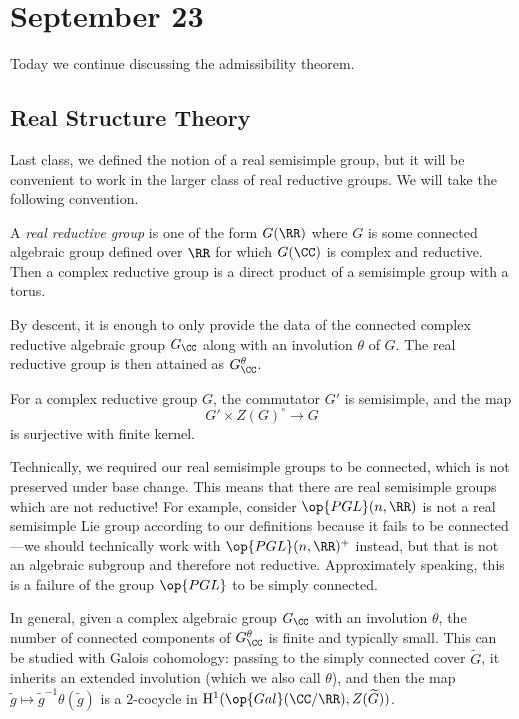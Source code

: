 \documentclass[../notes.tex]{subfiles}
\begin{document}
\section{September 23}
Today we continue discussing the admissibility theorem.

\subsection{Real Structure Theory}
Last class, we defined the notion of a real semisimple group, but it will be convenient to work in the larger class of real reductive groups. We will take the following convention.
\begin{definition}[reductive]
	A \textit{real reductive group} is one of the form $G(\RR)$ where $G$ is some connected algebraic group defined over $\RR$ for which $G(\CC)$ is complex and reductive. Then a complex reductive group is a direct product of a semisimple group with a torus.
\end{definition}
\begin{remark}
	By descent, it is enough to only provide the data of the connected complex reductive algebraic group $G_\CC$ along with an involution $\theta$ of $G$. The real reductive group is then attained as $G_\CC^\theta$.
\end{remark}
\begin{remark}
	For a complex reductive group $G$, the commutator $G'$ is semisimple, and the map
	\[G'\times Z(G)^\circ\to G\]
	is surjective with finite kernel.
\end{remark}
\begin{example}
	Technically, we required our real semisimple groups to be connected, which is not preserved under base change. This means that there are real semisimple groups which are not reductive! For example, consider $\op{PGL}(n,\RR)$ is not a real semisimple Lie group according to our definitions because it fails to be connected---we should technically work with $\op{PGL}(n,\RR)^+$ instead, but that is not an algebraic subgroup and therefore not reductive. Approximately speaking, this is a failure of the group $\op{PGL}$ to be simply connected.
\end{example}
\begin{remark}
	In general, given a complex algebraic group $G_\CC$ with an involution $\theta$, the number of connected components of $G_\CC^\theta$ is finite and typically small. This can be studied with Galois cohomology: passing to the simply connected cover $\widetilde G$, it inherits an extended involution (which we also call $\theta$), and then the map $\widetilde g\mapsto\widetilde g^{-1}\theta(\widetilde g)$ is a $2$-cocycle in $\mathrm H^1(\op{Gal}(\CC/\RR),Z(\widetilde G))$.
\end{remark}
\end{document}
